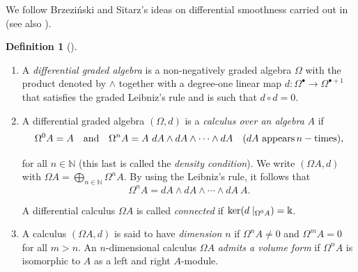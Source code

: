 \documentclass{amsart}
\theoremstyle{definition}
\newtheorem{definition}[theorem]{Definition}
\theoremstyle{remark}
\numberwithin{equation}{section}
\begin{document}


We follow Brzezi\'nski and Sitarz's ideas on differential smoothness carried out in \cite[Section 2]{BrzezinskiSitarz2017} (see also \cite{Brzezinski2008, Brzezinski2014, BrzezinskiElKaoutitLomp2010}).

\begin{definition}[{\cite[Section 2.1]{BrzezinskiSitarz2017}}]
\begin{enumerate}
    \item [\rm (i)] A {\em differential graded algebra} is a non-negatively graded algebra $\Omega$ with the product denoted by $\wedge$ together with a degree-one linear map $d:\Omega^{\bullet} \to \Omega^{\bullet +1}$ that satisfies the graded Leibniz's rule and is such that $d \circ d = 0$. 
    
    \item [\rm (ii)] A differential graded algebra $(\Omega, d)$ is a {\em calculus over an algebra} $A$ if 
    $$
    \Omega^0 A = A \quad {\rm and} \quad \Omega^n A = A\ dA \wedge dA \wedge \dotsb \wedge dA \quad (dA \, \, {\rm appears} \, n-{\rm times}), 
    $$
    
    for all $n\in \mathbb{N}$ (this last is called the {\em density condition}). We write $(\Omega A, d)$ with $\Omega A = \bigoplus_{n\in \mathbb{N}} \Omega^{n}A$. By using the Leibniz's rule, it follows that 
    $$
    \Omega^n A = dA \wedge dA \wedge \dotsb \wedge dA\ A.
    $$
    
    A differential calculus $\Omega A$ is called {\em connected} if ${\rm ker}(d\mid_{\Omega^0 A}) = \Bbbk$.
    
    \item [\rm (iii)] A calculus $(\Omega A, d)$ is said to have {\em dimension} $n$ if $\Omega^n A\neq 0$ and $\Omega^m A = 0$ for all $m > n$. An $n$-dimensional calculus $\Omega A$ {\em admits a volume form} if $\Omega^n A$ is isomorphic to $A$ as a left and right $A$-module. 
\end{enumerate}
\end{definition}
\end{document}
